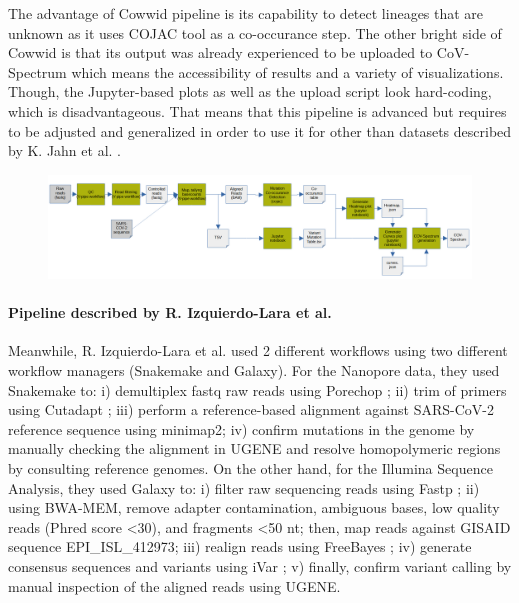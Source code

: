         The advantage of Cowwid pipeline is its capability to detect lineages that are unknown as it uses COJAC tool as a co-occurance step. The other bright side of Cowwid is that its output was already experienced to be uploaded to CoV-Spectrum which means the accessibility of results and a variety of visualizations. Though, the Jupyter-based plots as well as the upload script look hard-coding, which is disadvantageous. That means that this pipeline is advanced but requires to be adjusted and generalized in order to use it for other than datasets described by K. Jahn et al. \cite{jahn2022}. 
        \begin{landscape}
        \centering\vspace*{\fill}
        \begin{figure}[ht!]
        	\centering
            \includegraphics[width=1.4\textwidth]{figures/prior/cowwid.png}
            \label{fig:prior:cowwid}
        \end{figure}
        \vfill
        \end{landscape}
        
        
        \paragraph{Pipeline described by R. Izquierdo-Lara et al.}
        
        Meanwhile, R. Izquierdo-Lara et al. \cite{izquierdo} used 2 different workflows using two different workflow managers (Snakemake and Galaxy). For the Nanopore data, they used Snakemake to: i) demultiplex \acrshort{fastq} raw reads using Porechop \cite{wick2022}; ii) trim of primers using Cutadapt \cite{martin2011}; iii) perform a reference-based alignment against SARS-CoV-2 reference sequence using minimap2; iv) confirm mutations in the genome by manually checking the alignment in UGENE \cite{okonechnikov2012} and resolve homopolymeric regions by consulting reference genomes. On the other hand, for the Illumina Sequence Analysis, they used Galaxy to: i) filter raw sequencing reads using Fastp \cite{chen2018}; ii) using BWA-MEM, remove adapter contamination, ambiguous bases, low quality reads (Phred score <30), and fragments <50 nt; then, map reads against GISAID sequence EPI\_ISL\_412973; iii) realign reads using FreeBayes \cite{garrison2012}; iv) generate consensus sequences and variants using iVar \cite{grubaugh2019}; v) finally, confirm variant calling by manual inspection of the aligned reads using UGENE.

